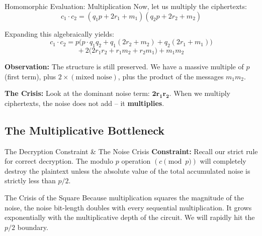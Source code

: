 \documentclass[10pt]{beamer}
\begin{document}
\begin{frame}{Homomorphic Evaluation: Multiplication}
    Now, let us multiply the ciphertexts:
    $$c_1 \cdot c_2 = (q_1 p + 2r_1 + m_1)(q_2 p + 2r_2 + m_2)$$
    \pause
    
    Expanding this algebraically yields:
    $$c_1 \cdot c_2 = p \big( p \cdot q_1 q_2 + q_1(2r_2 + m_2) + q_2(2r_1 + m_1) \big)$$
    $$+ \ 2 \big( 2r_1 r_2 + r_1 m_2 + r_2 m_1 \big) + m_1 m_2$$
    \pause
    
    \vspace{0.3cm}
    \textbf{Observation:}
    The structure is still preserved. We have a massive multiple of $p$ (first term), plus $2 \times (\text{mixed noise})$, plus the product of the messages $m_1 m_2$.
    
    \vspace{0.2cm}
    \textbf{The Crisis:} Look at the dominant noise term: $\mathbf{2r_1 r_2}$. When we multiply ciphertexts, the noise does not add -- it \textbf{multiplies}.
\end{frame}

\subsection{The Multiplicative Bottleneck}

\begin{frame}{The Decryption Constraint \& The Noise Crisis}
    \textbf{Constraint:} 
    Recall our strict rule for correct decryption. The modulo $p$ operation $(c \pmod p)$ will completely destroy the plaintext unless the absolute value of the total accumulated noise is strictly less than $p/2$.
    \pause
    
    \vspace{0.3cm}
    \begin{block}{The Crisis of the Square}
    Because multiplication squares the magnitude of the noise, the noise bit-length doubles with every sequential multiplication. It grows exponentially with the multiplicative depth of the circuit. We will rapidly hit the $p/2$ boundary.
    \end{block}
\end{frame}
\end{document}
